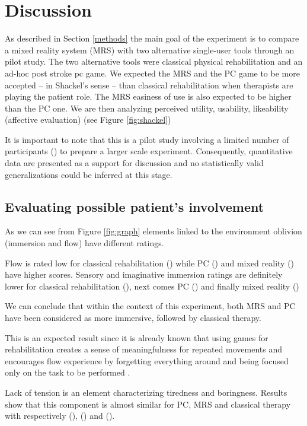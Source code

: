 \documentclass[preprint,authoryear,12pt]{elsarticle}
\begin{document}
\section{Discussion}
\label{discussion}
As described in Section \ref{methods} the main goal of the experiment is to compare a mixed reality system (MRS) with two alternative single-user tools through an pilot study. The two alternative tools were classical physical rehabilitation and an ad-hoc post stroke pc game. We expected the MRS and the PC game to be more accepted  -- in Shackel's sense \citep{Shackel1991} -- than classical rehabilitation when therapists are playing the patient role. The MRS easiness of use is also expected to be higher than the PC one. We are then analyzing perceived utility, usability, likeability (affective evaluation) (see Figure \ref{fig:shackel})

It is important to note that this is a pilot study involving a limited number of participants () to prepare a larger scale experiment. Consequently, quantitative data are presented as a support for discussion and no statistically valid generalizations could be inferred at this stage.

\subsection{Evaluating possible patient's involvement}
\label{patient}
As we can see from Figure \ref{fig:graph} elements linked to the environment oblivion (immersion and flow) have different ratings. 

Flow is rated low for classical rehabilitation () while PC () and mixed reality () have higher scores. 
Sensory and imaginative immersion ratings are definitely lower for classical rehabilitation (), next comes PC () and finally mixed reality ()

We can conclude that within the context of this experiment, both MRS and PC have been considered as more immersive, followed by classical therapy. 

This is an expected result since it is already known that using games for rehabilitation creates a sense of meaningfulness for repeated movements and encourages flow experience by forgetting everything around and being focused only on the task to be performed \citep{Reid2004}.

Lack of tension is an element characterizing tiredness and boringness. Results show that this component is almost similar for PC, MRS and classical therapy with respectively (), () and (). 
\end{document}
